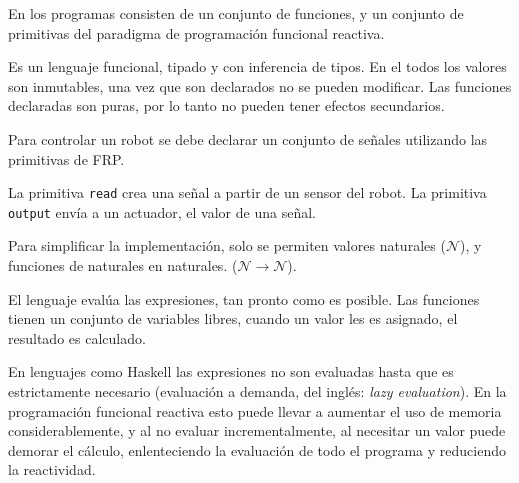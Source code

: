 
  En \frob{} los programas consisten de un conjunto de funciones, y un
conjunto de primitivas del paradigma de programación funcional reactiva.
  
  Es un lenguaje funcional, tipado y con inferencia de tipos.
  En el todos los valores son inmutables, una vez que son declarados
no se pueden modificar.
  Las funciones declaradas son puras, por lo tanto no pueden tener efectos
secundarios.

  Para controlar un robot se debe declarar un conjunto de señales utilizando
las primitivas de FRP.

  La primitiva \texttt{read} crea una señal a partir de un sensor del robot.
  La primitiva \texttt{output} envía a un actuador, el valor de una señal.

  Para simplificar la implementación, solo se permiten valores
naturales ($\mathcal{N}$), y funciones de naturales en naturales. 
($\mathcal{N} \rightarrow \mathcal{N}$).

  El lenguaje evalúa las expresiones, tan pronto como es posible. Las
funciones tienen un conjunto de variables libres, cuando un valor les es
asignado, el resultado es calculado.
  
  En lenguajes como Haskell las expresiones no son evaluadas hasta que es
estrictamente necesario (evaluación a demanda,
del inglés: \emph{lazy evaluation}). En la programación funcional reactiva
esto puede llevar a aumentar el uso de memoria considerablemente, y al no
evaluar incrementalmente, al necesitar un valor puede demorar el cálculo,
enlenteciendo la evaluación de todo el programa y reduciendo la reactividad.

